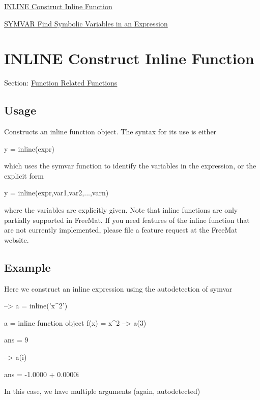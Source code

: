 
\begin{DoxyItemize}
\item \hyperlink{function_inline}{I\-N\-L\-I\-N\-E Construct Inline Function}  
\item \hyperlink{function_symvar}{S\-Y\-M\-V\-A\-R Find Symbolic Variables in an Expression}  
\end{DoxyItemize}\hypertarget{function_inline}{}\section{I\-N\-L\-I\-N\-E Construct Inline Function}\label{function_inline}
Section\-: \hyperlink{sec_function}{Function Related Functions} \hypertarget{vtkwidgets_vtkxyplotwidget_Usage}{}\subsection{Usage}\label{vtkwidgets_vtkxyplotwidget_Usage}
Constructs an inline function object. The syntax for its use is either \begin{DoxyVerb}   y = inline(expr)
\end{DoxyVerb}
 which uses the {\ttfamily symvar} function to identify the variables in the expression, or the explicit form \begin{DoxyVerb}   y = inline(expr,var1,var2,...,varn)
\end{DoxyVerb}
 where the variables are explicitly given. Note that inline functions are only partially supported in Free\-Mat. If you need features of the inline function that are not currently implemented, please file a feature request at the Free\-Mat website. \hypertarget{variables_struct_Example}{}\subsection{Example}\label{variables_struct_Example}
Here we construct an inline expression using the autodetection of {\ttfamily symvar}


\begin{DoxyVerbInclude}
--> a = inline('x^2')

a = 
  inline function object
  f(x) = x^2
--> a(3)

ans = 
 9 

--> a(i)

ans = 
  -1.0000 +  0.0000i 
\end{DoxyVerbInclude}


In this case, we have multiple arguments (again, autodetected)


